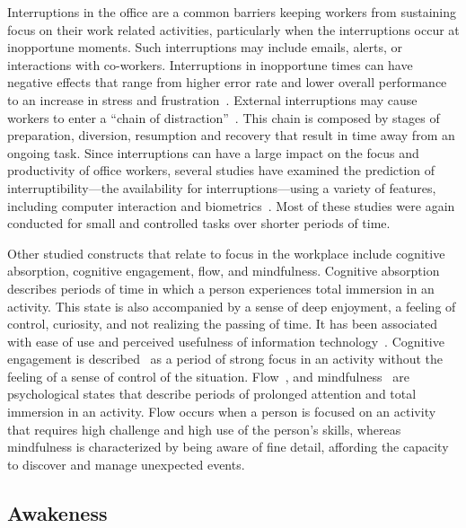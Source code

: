 Interruptions in the office are a common barriers keeping workers from sustaining focus on their work related activities, particularly when the interruptions occur at inopportune moments.
Such interruptions may include emails, alerts, or interactions with co-workers\cite{gonzalez2004constant,chong2006interruptions,shamsi07}. Interruptions in inopportune times can have negative effects that range from higher error rate and lower overall performance
to an increase in stress and frustration~\cite{bailey2001effects,czerwinski2000instant,mark2008cost}.
External interruptions may cause workers to enter a ``chain of distraction''~\cite{shamsi07}.
This chain is composed by stages of preparation, diversion, resumption and recovery that result in time away from an ongoing task. Since interruptions can have a large impact on the focus and productivity of office workers, several studies have examined the prediction of interruptibility---the availability for interruptions---using a variety of features, including computer interaction and biometrics~\cite{fogarty2005examining, iqbal2008effects, chen2004using, bailey2008understanding, zuger2015interruptibility, zuger18}. Most of these studies were again conducted for small and controlled tasks over shorter periods of time.


Other studied constructs that relate to focus in the workplace include cognitive absorption, cognitive engagement, flow, and mindfulness.
Cognitive absorption describes periods of time in which a person experiences total immersion in an activity.
This state is also accompanied by a sense of deep enjoyment, a feeling of control, curiosity, and not realizing the passing of time.
It has been associated with ease of use and perceived usefulness of information technology~\cite{agarwal00}.
Cognitive engagement is described~\cite{webster97} as a period of strong focus in an activity without the feeling of a sense of control of the situation.
Flow~\cite{Csikszentmihalyi90}, and mindfulness~\cite{Weick06,dane11} are psychological states that describe periods of prolonged attention and total immersion in an activity. Flow occurs when a person is focused on an activity that requires high challenge and high use of the person's skills, whereas mindfulness is characterized by being aware of fine detail, affording the capacity to discover and manage unexpected events.

\subsection{Awakeness}

